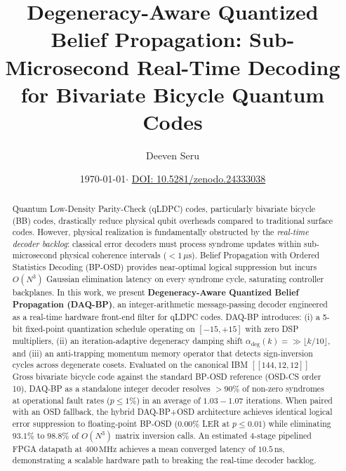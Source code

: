 \documentclass[aps,prxquantum,reprint,twocolumn,superscriptaddress,nofootinbib]{revtex4-2}
\begin{document}
\title{Degeneracy-Aware Quantized Belief Propagation: Sub-Microsecond Real-Time Decoding for Bivariate Bicycle Quantum Codes}

\author{Deeven Seru}

\date{\today \quad $\cdot$ \quad \href{https://doi.org/10.5281/zenodo.24333038}{DOI: 10.5281/zenodo.24333038}}

\begin{abstract}
Quantum Low-Density Parity-Check (qLDPC) codes, particularly bivariate bicycle (BB) codes, drastically reduce physical qubit overheads compared to traditional surface codes. However, physical realization is fundamentally obstructed by the \textit{real-time decoder backlog}: classical error decoders must process syndrome updates within sub-microsecond physical coherence intervals ($< 1\,\mu\text{s}$). Belief Propagation with Ordered Statistics Decoding (BP-OSD) provides near-optimal logical suppression but incurs $O(N^3)$ Gaussian elimination latency on every syndrome cycle, saturating controller backplanes.
In this work, we present \textbf{Degeneracy-Aware Quantized Belief Propagation (DAQ-BP)}, an integer-arithmetic message-passing decoder engineered as a real-time hardware front-end filter for qLDPC codes. DAQ-BP introduces: (i) a 5-bit fixed-point quantization schedule operating on $[-15, +15]$ with zero DSP multipliers, (ii) an iteration-adaptive degeneracy damping shift $\alpha_{\text{deg}}(k) = {\gg} \lfloor k/10 \rfloor$, and (iii) an anti-trapping momentum memory operator that detects sign-inversion cycles across degenerate cosets. Evaluated on the canonical IBM $[[144, 12, 12]]$ Gross bivariate bicycle code against the standard BP-OSD reference (OSD-CS order 10), DAQ-BP as a standalone integer decoder resolves $>90\%$ of non-zero syndromes at operational fault rates ($p \le 1\%$) in an average of $1.03 - 1.07$ iterations. When paired with an OSD fallback, the hybrid DAQ-BP+OSD architecture achieves identical logical error suppression to floating-point BP-OSD ($0.00\%$ LER at $p \le 0.01$) while eliminating $93.1\%$ to $98.8\%$ of $O(N^3)$ matrix inversion calls. An estimated 4-stage pipelined FPGA datapath at $400\,\text{MHz}$ achieves a mean converged latency of $10.5\,\text{ns}$, demonstrating a scalable hardware path to breaking the real-time decoder backlog.
\end{abstract}

\maketitle
\end{document}
